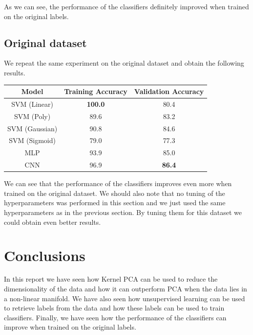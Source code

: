 As we can see, the performance of the classifiers definitely improved
when trained on the original labels.

\subsection{Original dataset}
We repeat the same experiment on the original dataset and obtain the
following results.
\begin{table}[H]
    \centering
    \begin{tabular}{|c|c|c|}
        \hline
        Model          & Training Accuracy & Validation Accuracy \\
        \hline
        SVM (Linear)   & \textbf{100.0} & 80.4 \\
        SVM (Poly)     & 89.6 & 83.2 \\
        SVM (Gaussian) & 90.8 & 84.6 \\
        SVM (Sigmoid)  & 79.0 & 77.3 \\
        MLP            & 93.9 & 85.0 \\
        CNN            & 96.9 & \textbf{86.4} \\
        \hline
    \end{tabular}
\end{table}
We can see that the performance of the classifiers improves even more
when trained on the original dataset. We should also note that no 
tuning of the hyperparameters was performed in this section and we 
just used the same hyperparameters as in the previous section.
By tuning them for this dataset we could obtain even better results.


\section{Conclusions}
In this report we have seen how Kernel PCA can be used to reduce the
dimensionality of the data and how it can outperform PCA when the data
lies in a non-linear manifold.
We have also seen how unsupervised learning can be used to retrieve
labels from the data and how these labels can be used to train classifiers.
Finally, we have seen how the performance of the classifiers can improve
when trained on the original labels.